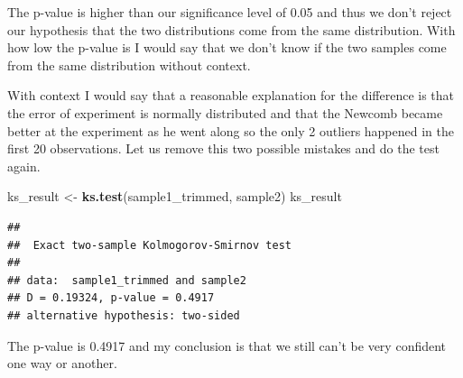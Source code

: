 \documentclass[
]{article}
\newenvironment{Shaded}{\begin{snugshade}}{\end{snugshade}}
\newcommand{\FunctionTok}[1]{\textcolor[rgb]{0.13,0.29,0.53}{\textbf{#1}}}
\newcommand{\NormalTok}[1]{#1}
\newcommand{\OtherTok}[1]{\textcolor[rgb]{0.56,0.35,0.01}{#1}}
\begin{document}
The p-value is higher than our significance level of 0.05 and thus we
don't reject our hypothesis that the two distributions come from the
same distribution. With how low the p-value is I would say that we don't
know if the two samples come from the same distribution without context.

With context I would say that a reasonable explanation for the
difference is that the error of experiment is normally distributed and
that the Newcomb became better at the experiment as he went along so the
only 2 outliers happened in the first 20 observations. Let us remove
this two possible mistakes and do the test again.

\begin{Shaded}
\begin{Highlighting}[]
\NormalTok{ks\_result }\OtherTok{\textless{}{-}} \FunctionTok{ks.test}\NormalTok{(sample1\_trimmed, sample2)}
\NormalTok{ks\_result}
\end{Highlighting}
\end{Shaded}

\begin{verbatim}
## 
##  Exact two-sample Kolmogorov-Smirnov test
## 
## data:  sample1_trimmed and sample2
## D = 0.19324, p-value = 0.4917
## alternative hypothesis: two-sided
\end{verbatim}

The p-value is 0.4917 and my conclusion is that we still can't be very
confident one way or another.
\end{document}

